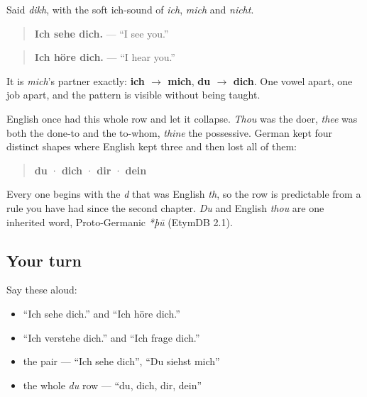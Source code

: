 Said \emph{dikh}, with the soft ich-sound of \emph{ich}, \emph{mich} and \emph{nicht}.

\begin{quote}
\textbf{Ich sehe dich.} — \textquotedblleft{}I see you.\textquotedblright{}
\end{quote}

\begin{quote}
\textbf{Ich höre dich.} — \textquotedblleft{}I hear you.\textquotedblright{}
\end{quote}

It is \emph{mich}'s partner exactly: \textbf{ich $\to$ mich}, \textbf{du $\to$ dich}. One vowel apart, one job apart, and the pattern is visible without being taught.

\begin{cousinweb}
English once had this whole row and let it collapse. \emph{Thou} was the doer, \emph{thee} was both the done-to and the to-whom, \emph{thine} the possessive. German kept four distinct shapes where English kept three and then lost all of them:

\begin{quote}
\textbf{du} · \textbf{dich} · \textbf{dir} · \textbf{dein}
\end{quote}

Every one begins with the \emph{d} that was English \emph{th}, so the row is predictable from a rule you have had since the second chapter. \emph{Du} and English \emph{thou} are one inherited word, Proto-Germanic \emph{*þū} (EtymDB 2.1).
\end{cousinweb}

\subsection*{Your turn}
Say these aloud:

\begin{itemize}
\raggedright
  \item \textquotedblleft{}Ich sehe dich.\textquotedblright{} and \textquotedblleft{}Ich höre dich.\textquotedblright{}
  \item \textquotedblleft{}Ich verstehe dich.\textquotedblright{} and \textquotedblleft{}Ich frage dich.\textquotedblright{}
  \item the pair — \textquotedblleft{}Ich sehe dich\textquotedblright{}, \textquotedblleft{}Du siehst mich\textquotedblright{}
  \item the whole \emph{du} row — \textquotedblleft{}du, dich, dir, dein\textquotedblright{}
\end{itemize}

